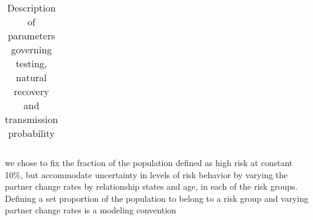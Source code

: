 \documentclass{article}
\begin{document}
\begin{normalsize}
\begin{table}[H]
\begin{tabular}{ |p{5cm}|p{7cm}|p{5cm}| }

    		
    	\end{tabular}
    	\label{tab:parameter}
    	\caption{Description of parameters governing testing, natural recovery and transmission probability}
   \end{table}
   
   	we chose to fix the fraction of the population defined as high risk at constant 10\%, but accommodate uncertainty in levels of risk behavior by varying the partner change rates by relationship states and age, in each of the risk groups. Defining a set proportion of the population to belong to a risk group and varying partner change rates is a modeling convention

    

	


\end{normalsize}
  
\end{document}
